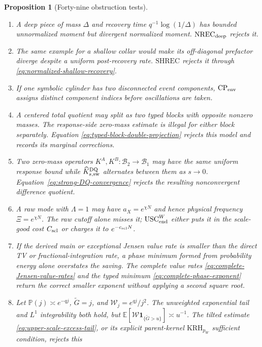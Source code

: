 \documentclass[11pt]{article}
\newtheorem{proposition}[theorem]{Proposition}
\newcommand{\cB}{\mathcal B}
\newcommand{\one}{\mathbf 1}
\begin{document}
\begin{proposition}[Forty-nine obstruction tests]
\begin{enumerate}[label=\textup{(T\arabic*)}]
      the latter and never infers it from signed TV.
\item A deep piece of mass $\Delta$ and recovery time
      $q^{-1}\log(1/\Delta)$ has bounded unnormalized moment but divergent
      normalized moment.  $\mathrm{NREC}_{\rm deep}$ rejects it.
\item The same example for a shallow collar would make its off-diagonal
      prefactor diverge despite a uniform post-recovery rate.
      $\mathrm{SHREC}$ rejects it through
      \eqref{eq:normalized-shallow-recovery}.
\item If one symbolic cylinder has two disconnected event components,
      $\mathrm{CP}_{\rm env}$ assigns distinct component indices before
      oscillations are taken.
\item A centered total quotient may split as two typed blocks with opposite
      nonzero masses.  The response-side zero-mass estimate is illegal for
      either block separately.  Equation
      \eqref{eq:typed-block-double-projection} rejects this model and records
      its marginal corrections.
\item Two zero-mass operators $K^A,K^B:\cB_2\to\cB_1$ may have the same
      uniform response bound while
      $\widehat K_{s,\rm sw}^{\rm DQ}$ alternates between them as $s\to0$.
      Equation~\eqref{eq:strong-DQ-convergence} rejects the resulting
      nonconvergent difference quotient.
\item A raw mode with $\Lambda=1$ may have $a_X=e^{\chi N}$ and hence
      physical frequency $\Xi=e^{\chi N}$.  The raw cutoff alone misses it;
      $\mathrm{USC}_{\rm end}^{W}$ either puts it in the scale-good cost
      $C_{\rm scl}$ or charges it to $e^{-c_{\rm scl}N}$.
\item If the derived main or exceptional Jensen value rate is smaller than
      the direct TV or fractional-integration rate, a phase minimum formed
      from probability energy alone overstates the saving.  The complete
      value rates \eqref{eq:complete-Jensen-value-rates} and the typed
      minimum \eqref{eq:complete-phase-exponent} return the correct smaller
      exponent without applying a second square root.
\item Let $\mathbb P(j)\asymp e^{-qj}$,
      $\widetilde G=j$, and $\mathscr W_j=e^{qj}/j^2$.  The unweighted
      exponential tail and $L^1$ integrability both hold, but
      $\mathbb E[\mathscr W\one_{\{\widetilde G>u\}}]\asymp u^{-1}$.
      The tilted estimate \eqref{eq:upper-scale-excess-tail}, or its explicit
      parent-kernel $\mathrm{KRH}_{p_W}$ sufficient condition, rejects this

\end{enumerate}
\end{proposition}
\end{document}
